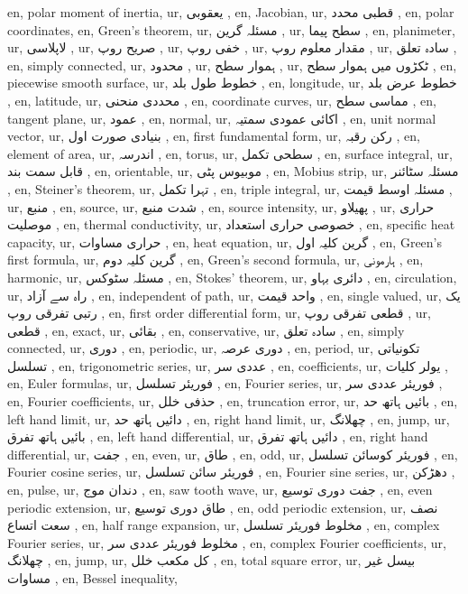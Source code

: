 en, polar moment of inertia,
ur, یعقوبی ,
en, Jacobian,
ur, قطبی محدد ,
en, polar coordinates,
en, Green's theorem,
ur, مسئلہ گرین ,
ur, سطح پیما ,
en, planimeter,
ur, لاپلاسی ,
ur, صریح روپ ,
ur, خفی روپ ,
ur, مقدار معلوم روپ ,
ur, سادہ تعلق ,
en, simply connected,
ur, محدود ,
ur, ہموار سطح ,
ur, ٹکڑوں میں ہموار سطح ,
en, piecewise smooth surface,
ur, خطوط طول بلد ,
en, longitude,
ur, خطوط عرض بلد ,
en, latitude,
ur, محددی منحنی ,
en, coordinate curves,
ur, مماسی سطح ,
en, tangent plane,
ur, عمود ,
en, normal,
ur, اکائی عمودی سمتیہ ,
en, unit normal vector,
ur, بنیادی صورت اول ,
en, first fundamental form,
ur, رکن رقبہ ,
en, element of area,
ur, اندرسہ ,
en, torus,
ur, سطحی تکمل ,
en, surface integral,
ur, قابل سمت بند ,
en, orientable,
ur, موبیوس پٹی ,
en, Mobius strip,
ur, مسئلہ سٹائنر ,
en, Steiner's theorem,
ur, تہرا تکمل ,
en, triple integral,
ur, مسئلہ اوسط قیمت ,
ur, منبع ,
en, source,
ur, شدت منبع ,
en, source intensity,
ur, پھیلاو ,
ur, حراری موصلیت ,
en, thermal conductivity,
ur, خصوصی حراری استعداد ,
en, specific heat capacity,
ur, حراری مساوات ,
en, heat equation,
ur, گرین کلیہ اول ,
en, Green's first formula,
ur, گرین کلیہ دوم ,
en, Green's second formula,
ur, ہارمونی ,
en, harmonic,
ur, مسئلہ سٹوکس ,
en, Stokes' theorem,
ur, دائری بہاو ,
en, circulation,
ur, راہ سے آزاد ,
en, independent of path,
ur, واحد قیمت ,
en, single valued,
ur, یک رتبی تفرقی روپ ,
en, first order differential form,
ur, قطعی تفرقی روپ ,
ur, قطعی ,
en, exact,
ur, بقائی ,
en, conservative,
ur, سادہ تعلق ,
en, simply connected,
ur, دوری ,
en, periodic,
ur, دوری عرصہ ,
en, period,
ur, تکونیاتی تسلسل ,
en, trigonometric series,
ur, عددی سر ,
en, coefficients,
ur, یولر کلیات ,
en, Euler formulas,
ur, فوریئر تسلسل ,
en, Fourier series,
ur, فوریئر عددی سر ,
en, Fourier coefficients,
ur, حذفی خلل ,
en, truncation error,
ur, بائیں ہاتھ حد ,
en, left hand limit,
ur, دائیں ہاتھ حد ,
en, right hand limit,
ur, چھلانگ ,
en, jump,
ur, بائیں ہاتھ تفرق ,
en, left hand differential,
ur, دائیں ہاتھ تفرق ,
en, right hand differential,
ur, جفت ,
en, even,
ur, طاق ,
en, odd,
ur, فوریئر کوسائن تسلسل ,
en, Fourier cosine series,
ur, فوریئر سائن تسلسل ,
en, Fourier sine series,
ur, دھڑکن ,
en, pulse,
ur, دندان موج ,
en, saw tooth wave,
ur, جفت دوری توسیع ,
en, even periodic extension,
ur, طاق دوری توسیع ,
en, odd periodic extension,
ur, نصف سعت اتساع ,
en, half range expansion,
ur, مخلوط فوریئر تسلسل ,
en, complex Fourier series,
ur, مخلوط فوریئر عددی سر ,
en, complex Fourier coefficients,
ur, چھلانگ ,
en, jump,
ur, کل مکعب خلل ,
en, total square error,
ur,  بیسل غیر مساوات ,
en, Bessel inequality,

